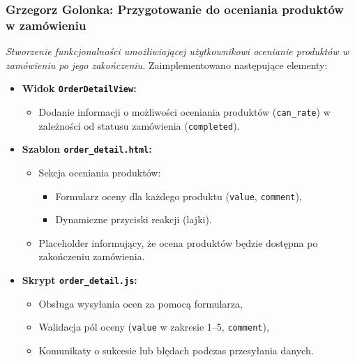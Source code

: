 \documentclass[12pt,a4paper,oneside]{article}
\theoremstyle{definition}
\numberwithin{equation}{section}
\begin{document}
\subsubsection{Grzegorz Golonka: Przygotowanie do oceniania produktów w zamówieniu}
\label{section:1.3.28}
\textit{
Stworzenie funkcjonalności umożliwiającej użytkownikowi ocenianie produktów w zamówieniu po jego zakończeniu.
}
Zaimplementowano następujące elementy:
\begin{itemize}
    \item \textbf{Widok \texttt{OrderDetailView}:}
    \begin{itemize}
        \item Dodanie informacji o możliwości oceniania produktów (\texttt{can\_rate}) w zależności od statusu zamówienia (\texttt{completed}).
    \end{itemize}
    \item \textbf{Szablon \texttt{order\_detail.html}:}
    \begin{itemize}
        \item Sekcja oceniania produktów:
        \begin{itemize}
            \item Formularz oceny dla każdego produktu (\texttt{value}, \texttt{comment}),
            \item Dynamiczne przyciski reakcji (lajki).
        \end{itemize}
        \item Placeholder informujący, że ocena produktów będzie dostępna po zakończeniu zamówienia.
    \end{itemize}
    \item \textbf{Skrypt \texttt{order\_detail.js}:}
    \begin{itemize}
        \item Obsługa wysyłania ocen za pomocą formularza,
        \item Walidacja pól oceny (\texttt{value} w zakresie 1–5, \texttt{comment}),
        \item Komunikaty o sukcesie lub błędach podczas przesyłania danych.
    \end{itemize}
\end{itemize}
% 
% 
% 
\end{document}
